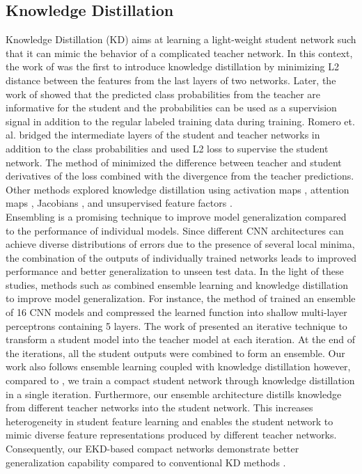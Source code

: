 \documentclass{ecai}
\begin{document}
\subsection{Knowledge Distillation}
Knowledge Distillation (KD) aims at learning a light-weight student network such that it can mimic the behavior of a complicated teacher network. In this context, the work of \cite{ba2014deep} was the first to introduce knowledge distillation by minimizing L2 distance between the features from the last layers of two networks. Later, the work of \cite{hinton2015distilling} showed that the predicted class probabilities from the teacher are informative for the student and the probabilities can be used as a supervision signal in addition to the regular labeled training data during training. 
Romero et. al. \cite{romero2014fitnets} bridged the intermediate layers of the student and teacher networks in addition to the class probabilities and used L2 loss to supervise the student network. The method of \cite{czarnecki2017sobolev} minimized the difference between teacher and student derivatives of the loss combined with the divergence from the teacher predictions. Other methods explored knowledge distillation using activation maps \cite{heo2019knowledge}, attention maps \cite{zagoruyko2016paying}, Jacobians \cite{srinivas2018knowledge}, and unsupervised feature factors \cite{kim2018paraphrasing}.
\\
\indent
Ensembling is a promising technique to improve model generalization compared to the performance of individual models. Since different CNN architectures can achieve diverse distributions of errors due to the presence of several local minima, the combination of the outputs of individually trained networks leads to improved performance and better generalization to unseen test data. 
In the light of these studies, methods such as \cite{urban2016deep,furlanello2018born} combined ensemble learning and knowledge distillation to improve model generalization. For instance, the method of \cite{urban2016deep} trained an ensemble of 16 CNN models and compressed the learned function into shallow multi-layer perceptrons containing 5 layers.
The work of \cite{furlanello2018born} presented an iterative technique to transform a student model into the teacher model at each iteration. At the end of the iterations, all the student outputs were combined to form an ensemble. Our work also follows ensemble learning coupled with knowledge distillation however, compared to \cite{furlanello2018born}, we train a compact student network through knowledge distillation in a single iteration. Furthermore, our ensemble architecture distills knowledge from different teacher networks into the student network. 
This increases heterogeneity in student feature learning and enables the student network to mimic diverse feature representations produced by different teacher networks. Consequently, our EKD-based compact networks demonstrate better generalization capability compared to conventional KD methods \cite{hinton2015distilling}.
\end{document}
